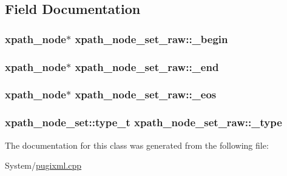 \subsection{Field Documentation}
\hypertarget{classxpath__node__set__raw_a8e6071473610e8340b07a64767ef68c0}{
\subsubsection[{\-\_\-begin}]{\setlength{\rightskip}{0pt plus 5cm}xpath\-\_\-node$\ast$ xpath\-\_\-node\-\_\-set\-\_\-raw\-::\-\_\-begin\hspace{0.3cm}{\ttfamily [private]}}}\label{classxpath__node__set__raw_a8e6071473610e8340b07a64767ef68c0}
\hypertarget{classxpath__node__set__raw_af8435774146a65edee6cf320dbb8930f}{
\subsubsection[{\-\_\-end}]{\setlength{\rightskip}{0pt plus 5cm}xpath\-\_\-node$\ast$ xpath\-\_\-node\-\_\-set\-\_\-raw\-::\-\_\-end\hspace{0.3cm}{\ttfamily [private]}}}\label{classxpath__node__set__raw_af8435774146a65edee6cf320dbb8930f}
\hypertarget{classxpath__node__set__raw_a886a925457f162fe38483da1d57b9b56}{
\subsubsection[{\-\_\-eos}]{\setlength{\rightskip}{0pt plus 5cm}xpath\-\_\-node$\ast$ xpath\-\_\-node\-\_\-set\-\_\-raw\-::\-\_\-eos\hspace{0.3cm}{\ttfamily [private]}}}\label{classxpath__node__set__raw_a886a925457f162fe38483da1d57b9b56}
\hypertarget{classxpath__node__set__raw_a00a164066aff1d6075631b2532ed9713}{
\subsubsection[{\-\_\-type}]{\setlength{\rightskip}{0pt plus 5cm}xpath\-\_\-node\-\_\-set\-::type\-\_\-t xpath\-\_\-node\-\_\-set\-\_\-raw\-::\-\_\-type\hspace{0.3cm}{\ttfamily [private]}}}\label{classxpath__node__set__raw_a00a164066aff1d6075631b2532ed9713}


The documentation for this class was generated from the following file\-:\begin{DoxyCompactItemize}
\item 
System/\hyperlink{pugixml_8cpp}{pugixml.\-cpp}\end{DoxyCompactItemize}
